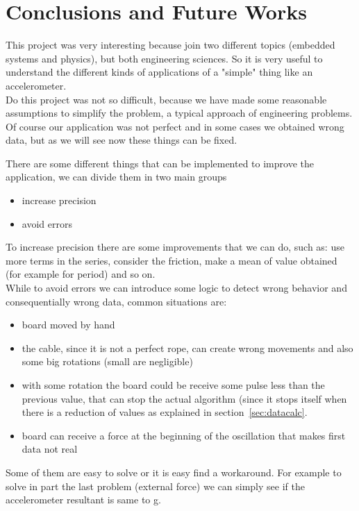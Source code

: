 \section{Conclusions and Future Works}
\label{sec:conclusions}
This project was very interesting because join two different topics (embedded systems and physics), but both engineering sciences. So it is very useful to understand the different kinds of applications of a "simple" thing like an accelerometer.\\
Do this project was not so difficult, because we have made some reasonable assumptions to simplify the problem, a typical approach of engineering problems. Of course our application was not perfect and in some cases we obtained wrong data, but as we will see now these things can be fixed.\par
There are some different things that can be implemented to improve the application, we can divide them in two main groups
\begin{itemize}
	\item increase precision
	\item avoid errors
\end{itemize}
To increase precision there are some improvements that we can do, such as: use more terms in the series, consider the friction, make a mean of value obtained (for example for period) and so on.\\
While to avoid errors we can introduce some logic to detect wrong behavior and consequentially wrong data, common situations are:
\begin{itemize}
	\item board moved by hand
	\item the cable, since it is not a perfect rope, can create wrong movements and also some big rotations (small are negligible)
	\item with some rotation the board could be receive some pulse less than the previous value, that can stop the actual algorithm (since it stops itself when there is a reduction of values as explained in section~\ref{sec:datacalc}.
	\item board can receive a force at the beginning of the oscillation that makes first data not real
\end{itemize}
Some of them are easy to solve or it is easy find a workaround. For example to solve in part the last problem (external force) we can simply see if the accelerometer resultant is same to g.


